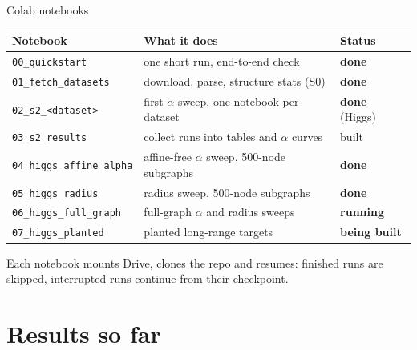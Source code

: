 \documentclass[aspectratio=169,10pt]{beamer}
\newcommand{\snote}[1]{{\scriptsize\textcolor{ink!70}{#1}}}
\newcommand{\sdone}{\textcolor{good}{\textbf{done}}}
\newcommand{\srun}{\textcolor{warm}{\textbf{running}}}
\newcommand{\sbuild}{\textcolor{warm}{\textbf{being built}}}
\begin{document}
\begin{frame}{Colab notebooks}
  \centering
  \small
  \begin{tabular}{@{}lL{0.55\textwidth}l@{}}
    \toprule
    Notebook & What it does & Status \\
    \midrule
    \texttt{00\_quickstart} & one short run, end-to-end check & \sdone \\
    \texttt{01\_fetch\_datasets} & download, parse, structure stats (S0) & \sdone \\
    \texttt{02\_s2\_<dataset>} & first $\alpha$ sweep, one notebook per dataset & \sdone{} (Higgs) \\
    \texttt{03\_s2\_results} & collect runs into tables and $\alpha$ curves & built \\
    \texttt{04\_higgs\_affine\_alpha} & affine-free $\alpha$ sweep, 500-node subgraphs & \sdone \\
    \texttt{05\_higgs\_radius} & radius sweep, 500-node subgraphs & \sdone \\
    \texttt{06\_higgs\_full\_graph} & full-graph $\alpha$ and radius sweeps & \srun \\
    \texttt{07\_higgs\_planted} & planted long-range targets & \sbuild \\
    \bottomrule
  \end{tabular}
  \vspace{0.6em}

  \raggedright\snote{Each notebook mounts Drive, clones the repo and resumes: finished runs are skipped, interrupted runs continue from their checkpoint.}
\end{frame}

\section{Results so far}
\end{document}
